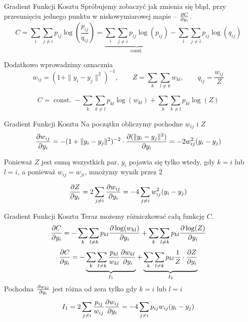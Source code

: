 \documentclass{beamer}
\DeclareMathOperator{\const}{const.}
\begin{document}
	\begin{frame}{Gradient Funkcji Kosztu}
		Spróbujemy zobaczyć jak zmienia się błąd, przy przesunięciu jednego punktu w niskowymiarowej mapie -- $\pdv{C}{y_i}$.
		\begin{equation*}
			C = \sum_{i}\sum_{j\neq i} p_{ij} \log(\frac{p_{ij}}{q_{ij}}) = \underbrace{\sum_{i}\sum_{j\neq i} p_{ij} \log(p_{ij})}_{\const} - \sum_{i}\sum_{j\neq i} p_{ij}\log(q_{ij})
		\end{equation*}
		
		Dodatkowo wprowadzimy oznacznia
		\begin{equation*}
			w_{ij} = (1 + \|y_i - y_j \|^2)^{-1}, \qquad Z = \sum_{k}\sum_{l\neq k} w_{kl}, \qquad q_{ij} = \frac{w_{ij}}{Z}
		\end{equation*}
		
		\begin{equation*}
			C = \const - \sum_{k}\sum_{k\neq l} p_{kl} \log(w_{kl}) + \sum_{k}\sum_{k\neq l} p_{kl} \log(Z)
		\end{equation*}
	\end{frame}
	
	\begin{frame}{Gradient Funkcji Kosztu}
		Na początku obliczymy pochodne $w_{ij}$ i $Z$
		\begin{equation*}
			\pdv{w_{ij}}{y_i} = -(1+\|y_i - y_j\|^2)^{-2} \cdot \pdv{(\|y_i - y_j\|^2)}{y_i} = -2 w_{ij}^2 (y_i - y_j)
		\end{equation*}
		
		Ponieważ $Z$ jest sumą wszystkich par, $y_i$ pojawia się tylko wtedy, gdy $k=i$ lub $l=i$, a ponieważ $w_{ij} = w_{ji}$, mnożymy wynik przez 2
		
		\begin{equation*}
			\pdv{Z}{y_i} = 2 \sum_{j\neq i} \pdv{w_{ij}}{y_i} = -4\sum_{j\neq i} w_{ij}^2 (y_i - y_j)
		\end{equation*}
	\end{frame}
	
	\begin{frame}{Gradient Funkcji Kosztu}
		Teraz możemy różniczkować całą funkcję $C$.
		\begin{equation*}
			\pdv{C}{y_i} = -\sum_{k}\sum_{l\neq k} p_{kl}\pdv{\log(w_{kl})}{y_i} + \sum_{k}\sum_{l\neq k} p_{kl}\pdv{\log(Z)}{y_i}
		\end{equation*}
		\begin{equation*}
			\pdv{C}{y_i} = -\underbrace{\sum_{k}\sum_{l\neq k} \frac{p_{kl}}{w_{kl}}\pdv{w_{kl}}{y_i}}_{I_1} +\underbrace{ \sum_{k}\sum_{l\neq k} p_{kl}  \frac{1}{Z} \cdot \pdv{Z}{y_i}}_{I_2}
		\end{equation*}
		Pochodna $\pdv{w_{kl}}{y_i}$ jest różna od zera tylko gdy $k=i$ lub $l=i$
		\begin{equation*}
			I_1 = 2\sum_{j\neq i} \frac{p_{ij}}{w_{ij}} \pdv{w_{ij}}{y_i} = -4\sum_{j\neq i}p_{ij} w_{ij}(y_i - y_j)
		\end{equation*}
	\end{frame}
	
\end{document}
